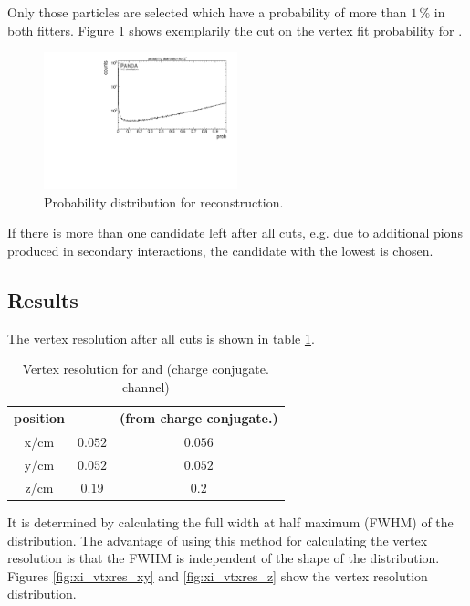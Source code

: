 		Only those particles are selected which have a probability of more than $1\,\%$ in both fitters. 
		Figure \ref{fig:XiPlus_prob} shows exemplarily the cut on the vertex fit probability for \anticascade.
		
		\begin{figure}
			\centering
				\includegraphics[width=0.50\textwidth]{./plots/Xi/XiPlus_prob.pdf}
			\caption{Probability distribution for \anticascade reconstruction.}
			\label{fig:XiPlus_prob}
		\end{figure}
			
		If there is more than one candidate left after all cuts, e.g. due to additional pions produced in secondary interactions, the candidate with the 
		lowest \chisq is chosen.
		
		
	\subsection*{Results}
		The vertex resolution after all cuts is shown in table \ref{tab:XiPlus_vtxres}. 
		
		\begin{table}
			\centering
			\caption{\propose Vertex resolution for \anticascade and \cascade (charge conjugate. channel)}
			\label{tab:XiPlus_vtxres}
			\begin{tabular}{ccc}
				\hline
				position & \anticascade & \cascade(from charge conjugate.) \\\hline
				\hline
				x/cm & $0.052$ & $0.056$\\
				y/cm & $0.052$ & $0.052$\\
				z/cm & $0.19$ & $0.2$\\
				\hline
				    
			\end{tabular}
		\end{table}
		
		It is determined by calculating the full width at half maximum (FWHM) of the distribution.
		The advantage of using this method for calculating the vertex resolution is that the FWHM is independent of the shape of the distribution.
		Figures \ref{fig:xi_vtxres_xy} and \ref{fig:xi_vtxres_z} show the vertex resolution distribution. 
		

